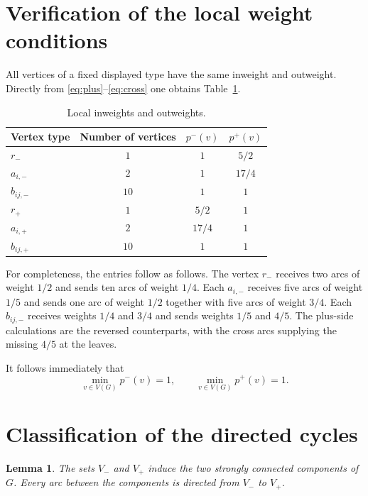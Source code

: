 \documentclass[10pt,reqno]{amsart}
\newcommand{\inwt}{p^{-}}
\newcommand{\outwt}{p^{+}}
\newtheorem{lemma}[theorem]{Lemma}
\theoremstyle{definition}
\begin{document}
\section{Verification of the local weight conditions}

All vertices of a fixed displayed type have the same inweight and outweight. Directly from \eqref{eq:plus}--\eqref{eq:cross} one obtains Table~\ref{tab:weights}.

\begin{table}[ht]
\caption{Local inweights and outweights.}
\label{tab:weights}
\centering
\begin{tabular}{@{}lccc@{}}
\toprule
Vertex type & Number of vertices & $\inwt(v)$ & $\outwt(v)$\\
\midrule
$r_-$       & $1$  & $1$    & $5/2$\\
$a_{i,-}$   & $2$  & $1$    & $17/4$\\
$b_{ij,-}$  & $10$ & $1$    & $1$\\
\addlinespace
$r_+$       & $1$  & $5/2$  & $1$\\
$a_{i,+}$   & $2$  & $17/4$ & $1$\\
$b_{ij,+}$  & $10$ & $1$    & $1$\\
\bottomrule
\end{tabular}
\end{table}

For completeness, the entries follow as follows. The vertex $r_-$ receives two arcs of weight $1/2$ and sends ten arcs of weight $1/4$. Each $a_{i,-}$ receives five arcs of weight $1/5$ and sends one arc of weight $1/2$ together with five arcs of weight $3/4$. Each $b_{ij,-}$ receives weights $1/4$ and $3/4$ and sends weights $1/5$ and $4/5$. The plus-side calculations are the reversed counterparts, with the cross arcs supplying the missing $4/5$ at the leaves.

It follows immediately that
\begin{equation}\label{eq:minlocal}
  \min_{v\in V(G)}\inwt(v)=1,
  \qquad
  \min_{v\in V(G)}\outwt(v)=1.
\end{equation}

\section{Classification of the directed cycles}

\begin{lemma}\label{lem:scc}
The sets $V_-$ and $V_+$ induce the two strongly connected components of $G$. Every arc between the components is directed from $V_-$ to $V_+$.
\end{lemma}
\end{document}
